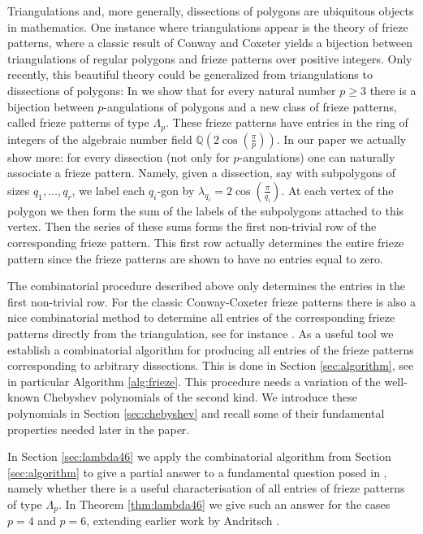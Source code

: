 \documentclass[11pt,a4paper]{amsart}
\theoremstyle{definition}
\numberwithin{equation}{section}
\begin{document}
Triangulations and, more generally, dissections of polygons are ubiquitous objects in mathematics. One instance 
where triangulations appear is the theory of frieze patterns, where a classic result of Conway and Coxeter 
\cite{CC73} yields a bijection between triangulations of regular polygons and frieze patterns over positive
integers. Only recently, 
this beautiful theory could be generalized from triangulations to dissections of polygons: In \cite{HJ17} we show that
for every natural number $p\ge 3$ there is a bijection between $p$-angulations of polygons and a new class of frieze
patterns,
called frieze patterns of type $\Lambda_p$. These frieze patterns have entries in the ring of integers of the algebraic number field
$\mathbb{Q}(2\cos(\frac{\pi}{p}))$. 
In our paper \cite{HJ17} we actually show more: for every dissection (not only for $p$-angulations) one can 
naturally associate a frieze pattern. Namely, given a dissection, say with subpolygons of sizes $q_1,\ldots,q_r$, 
we label each $q_i$-gon by $\lambda_{q_i}=2\cos(\frac{\pi}{q_i})$. At each vertex of the polygon we then form the 
sum of the labels of the subpolygons attached to this vertex. Then the series of these sums forms the first
non-trivial row of the corresponding frieze pattern. This first row actually determines the entire frieze pattern
since the frieze patterns are shown to have no entries equal to zero. 

The combinatorial procedure described above only determines the entries in the first non-trivial row. For the classic
Conway-Coxeter frieze patterns there is also a nice combinatorial method to determine all entries of the corresponding
frieze patterns directly from the triangulation, see for instance \cite{BCI74}. 
As a useful tool we establish a combinatorial algorithm for producing all entries of the frieze 
patterns corresponding to arbitrary dissections. This is done in Section \ref{sec:algorithm}, see in particular
Algorithm \ref{alg:frieze}. This procedure needs a variation of the well-known Chebyshev polynomials 
of the second kind. We introduce these polynomials in Section \ref{sec:chebyshev} and recall some of their
fundamental properties needed later in the paper. 

In Section \ref{sec:lambda46} we apply the combinatorial algorithm from Section \ref{sec:algorithm}
to give a partial answer to a fundamental question posed in \cite{HJ17}, namely whether there is 
a useful characterisation of all entries of frieze patterns of type $\Lambda_p$. In Theorem \ref{thm:lambda46} 
we give such an answer for the cases $p=4$ and $p=6$, extending earlier work by Andritsch \cite{A20}. 
\medskip
\end{document}
